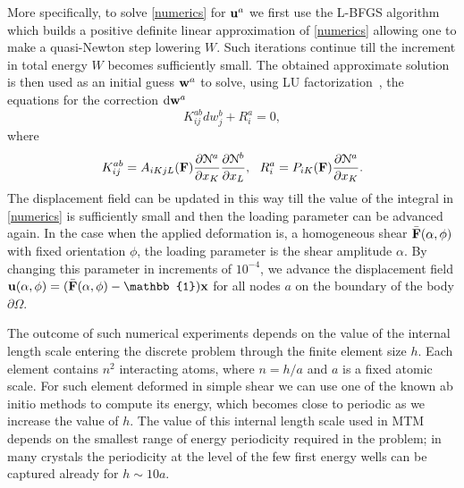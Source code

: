 \documentclass[CRPHYS,Unicode,manuscript]{cedram}
\begin{document}
More specifically, to solve  \eqref{numerics} for ${\bf u}^a$ we first   use  the L-BFGS algorithm~\cite{Bochkanov2013-lk} which      builds a positive definite linear approximation of \eqref{numerics}  allowing one  to make a quasi-Newton step lowering  $W$.  Such  iterations continue till  the increment  in total energy $W$ becomes sufficiently small. The obtained approximate solution is then   used as an initial guess  ${\bf w}^a$ to solve, using LU factorization~\cite{Sanderson2016-ht,itensor},  the  equations for the correction  $\text{d}{\bf w}^a$
\begin{equation}
\label{newton}
 K^{ab}_{ij}dw_j^b+R_i^a =0,
\end{equation}
where  
\begin{equation}K^{ab}_{ij}= A_{iKjL}({\bf F}) \frac{\partial {\mathcal N}^a}{\partial x_K}\frac{\partial {\mathcal N}^b}{\partial x_L},\,\,\ R^a_i=  P_{iK}( {\bf F}) \frac{\partial {\mathcal N}^a}{\partial x_K}.
\end{equation}  The displacement field can be updated in this way till   the value of  the integral in  \eqref{numerics} is sufficiently small and  then  the loading parameter can be  advanced again. In the case  when  the applied deformation is,  a homogeneous shear $\bar{\bf F}(\alpha,\phi)$  with  fixed orientation $\phi$, the loading parameter   is the shear amplitude   $\alpha$.  By changing this parameter in increments of $10^{-4}$,  we advance   the  displacement field   ${\bf u}(\alpha,\phi)= (\bar{\bf F}(\alpha,\phi)-\mathbb{1}){\bf x}$ for all nodes $a$ on the boundary of the body $\partial \Omega$. 

The outcome  of such  numerical experiments  depends on the value of the internal length scale   entering the discrete problem  through the finite element size $h$. Each element contains $n^2$ interacting atoms, where $n=h/a$ and $a$ is a fixed  atomic scale. For such element deformed in simple shear  we can  use one of the known  ab initio methods to compute its energy, which  becomes close  to periodic  as we  increase the  value of $h$.  The  value of this internal length scale  used in MTM depends on the smallest range of  energy periodicity  required  in the problem; in many crystals  the  periodicity  at the level of the few first energy wells  can be  captured   already for $h \sim 10a$.
%
%
\end{document}
